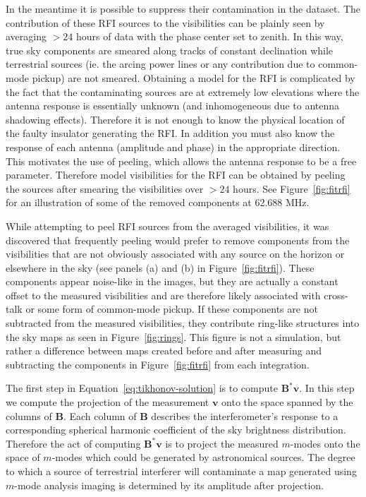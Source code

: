 \documentclass[twocolumn]{aastex61}
\renewcommand{\b}{\pmb}
\begin{document}
In the meantime it is possible to suppress their contamination in the dataset. The contribution of
these RFI sources to the visibilities can be plainly seen by averaging $>24$ hours of data with the
phase center set to zenith. In this way, true sky components are smeared along tracks of constant
declination while terrestrial sources (ie. the arcing power lines or any contribution due to
common-mode pickup) are not smeared.  Obtaining a model for the RFI is complicated by the fact that
the contaminating sources are at extremely low elevations where the antenna response is essentially
unknown (and inhomogeneous due to antenna shadowing effects). Therefore it is not enough to know the
physical location of the faulty insulator generating the RFI. In addition you must also know the
response of each antenna (amplitude and phase) in the appropriate direction. This motivates the use
of peeling, which allows the antenna response to be a free parameter.  Therefore model visibilities
for the RFI can be obtained by peeling the sources after smearing the visibilities over $>24$ hours.
See Figure~\ref{fig:fitrfi} for an illustration of some of the removed components at 62.688 MHz.

While attempting to peel RFI sources from the averaged visibilities, it was discovered that
frequently peeling would prefer to remove components from the visibilities that are not obviously
associated with any source on the horizon or elsewhere in the sky (see panels (a) and (b) in
Figure~\ref{fig:fitrfi}).  These components appear noise-like in the images, but they are actually a
constant offset to the measured visibilities and are therefore likely associated with cross-talk or
some form of common-mode pickup. If these components are not subtracted from the measured
visibilities, they contribute ring-like structures into the sky maps as seen in
Figure~\ref{fig:rings}. This figure is not a simulation, but rather a difference between maps
created before and after measuring and subtracting the components in Figure~\ref{fig:fitrfi} from
each integration.

The first step in Equation~\ref{eq:tikhonov-solution} is to compute $\b B^*\b v$. In this step we
compute the projection of the measurement $\b v$ onto the space spanned by the columns of $\b B$.
Each column of $\b B$ describes the interferometer's response to a corresponding spherical harmonic
coefficient of the sky brightness distribution. Therefore the act of computing $\b B^*\b v$ is to
project the measured $m$-modes onto the space of $m$-modes which could be generated by astronomical
sources. The degree to which a source of terrestrial interferer will contaminate a map generated
using $m$-mode analysis imaging is determined by its amplitude after projection.
\end{document}
